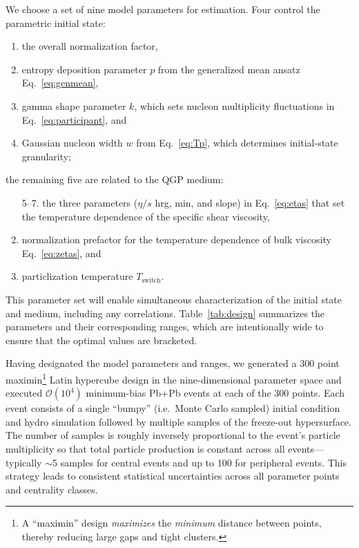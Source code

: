 \documentclass[aps,prc,reprint,amsmath,nofootinbib,noeprint]{revtex4-1}
\newcommand{\order}[1]{$\mathcal O(10^{#1})$}
\begin{document}
We choose a set of nine model parameters for estimation.
Four control the parametric initial state:
\begin{enumerate}[itemsep=0pt]
  \item the overall normalization factor,
  \item entropy deposition parameter $p$ from the generalized mean ansatz Eq.~\eqref{eq:genmean},
  \item gamma shape parameter $k$, which sets nucleon multiplicity fluctuations in Eq.~\eqref{eq:participant}, and
  \item Gaussian nucleon width $w$ from Eq.~\eqref{eq:Tp}, which determines initial-state granularity;
\end{enumerate}
the remaining five are related to the QGP medium:
\begin{enumerate}[itemsep=0pt]
  \item[5--7.] the three parameters ($\eta/s$ hrg, min, and slope) in Eq.~\eqref{eq:etas} that set the temperature dependence of the specific shear viscosity,
  \setcounter{enumi}{7}
  \item normalization prefactor for the temperature dependence of bulk viscosity Eq.~\eqref{eq:zetas}, and
  \item particlization temperature $T_\text{switch}$.
\end{enumerate}
This parameter set will enable simultaneous characterization of the initial state and medium, including any correlations.
Table~\ref{tab:design} summarizes the parameters and their corresponding ranges, which are intentionally wide to ensure that the optimal values are bracketed.

Having designated the model parameters and ranges, we generated a 300 point maximin\footnote{A ``maximin'' design \emph{maximizes} the \emph{minimum} distance between points, thereby reducing large gaps and tight clusters.} Latin hypercube design \cite{Morris:1995lh} in the nine-dimensional parameter space and executed \order 4 minimum-bias Pb+Pb events at each of the 300 points.
Each event consists of a single ``bumpy'' (i.e.\ Monte Carlo sampled) initial condition and hydro simulation followed by multiple samples of the freeze-out hypersurface.
The number of samples is roughly inversely proportional to the event's particle multiplicity so that total particle production is constant across all events---typically ${\sim}$5 samples for central events and up to 100 for peripheral events.
This strategy leads to consistent statistical uncertainties across all parameter points and centrality classes.
\end{document}
